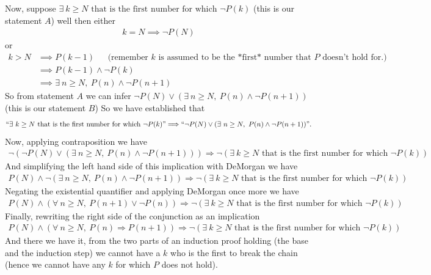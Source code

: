 \noindent Now, suppose $\exists \ k\geq N \text{ that is the first number for which }\lnot P(k)$ (this is our statement $A$) well then either
\begin{align*}
    k=N \implies \lnot P(N)
\end{align*}
or 
\begin{align*}
    k>N &\implies P(k-1) \ \ \ \ \ \ \ \text{(remember }k \text{ is assumed to be the *first* number that } P \text{ doesn't hold for.)}\\
    &\implies P(k-1)\land \lnot P(k) \\
    &\implies \exists \ n\geq N, \  P(n)\land \lnot P(n+1)
\end{align*}
So from statement $A$ we can infer $\lnot P(N)\lor (\exists \ n\geq N, \  P(n)\land \lnot P(n+1))$ (this is our statement $B$)
So we have established that 
\begin{align*}
    ``\exists \ k\geq N \text{ that is the first number for which }\lnot P(k)" \Longrightarrow ``\lnot P(N)\lor (\exists \ n\geq N, \  P(n)\land \lnot P(n+1))".
\end{align*}
Now, applying contraposition we have 
\begin{align*}
    \lnot(\lnot P(N)\lor (\exists \ n\geq N, \  P(n)\land \lnot P(n+1))) \Longrightarrow \lnot (\exists \ k\geq N \text{ that is the first number for which }\lnot P(k))
\end{align*}
And simplifying the left hand side of this implication with DeMorgan we have
\begin{align*}
    P(N)\land \lnot (\exists \ n\geq N, \  P(n)\land \lnot P(n+1)) \Longrightarrow \lnot (\exists \ k\geq N \text{ that is the first number for which }\lnot P(k))
\end{align*}
Negating the existential quantifier and applying DeMorgan once more we have
\begin{align*}
    P(N)\land (\forall \ n\geq N, \  P(n+1)\lor \lnot P(n)) \Longrightarrow \lnot (\exists \ k\geq N \text{ that is the first number for which }\lnot P(k))
\end{align*}
Finally, rewriting the right side of the conjunction as an implication
\begin{align*}
    P(N)\land (\forall \ n\geq N, \  P(n) \Rightarrow P(n+1)) \Longrightarrow \lnot (\exists \ k\geq N \text{ that is the first number for which }\lnot P(k))
\end{align*}
And there we have it, from the two parts of an induction proof holding (the base and the induction step) we cannot have a $k$ who is the first to break the chain (hence we cannot have any $k$ for which $P$ does not hold).

